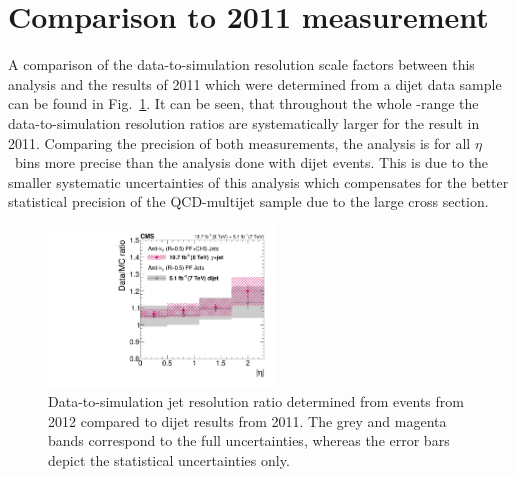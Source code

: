 \FloatBarrier
\section{Comparison to 2011 measurement}
\label{res:sec:comparison_2010}
A comparison of the data-to-simulation resolution scale factors \rhores between this analysis and the results of 2011 which were determined from a dijet data sample~\cite{bib:Matthias_Thesis} can be found in Fig.~\ref{res:fig:Comparison_2011}.
It can be seen, that throughout the whole \etajet-range the data-to-simulation resolution ratios \rhores are systematically larger for the result in 2011. 
Comparing the precision of both measurements, the \GAMJET analysis is for all $\eta$~bins more precise than the analysis done with dijet events.
This is due to the smaller systematic uncertainties of this analysis which compensates for the better statistical precision of the QCD-multijet sample due to the large cross section.

\begin{figure}[!h]
 \centering
 \includegraphics[width=0.54\textwidth]{figures/resolution/results/Figure_43_left_Teresa_cmsStyle_updated_5.pdf}
 \caption{Data-to-simulation jet \pt resolution ratio determined from \GAMJET events from 2012 compared to dijet results from 2011.
             The grey and magenta bands correspond to the full uncertainties, whereas the error bars depict the statistical uncertainties only.}
 \label{res:fig:Comparison_2011}
\end{figure}

